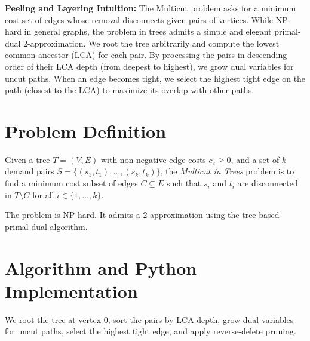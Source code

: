 \documentclass[11pt,oneside]{book}
\begin{document}
\begin{intuitionbox}
\textbf{Peeling and Layering Intuition:} The Multicut problem asks for a minimum cost set of edges whose removal disconnects given pairs of vertices. While NP-hard in general graphs, the problem in trees admits a simple and elegant primal-dual 2-approximation. We root the tree arbitrarily and compute the lowest common ancestor (LCA) for each pair. By processing the pairs in descending order of their LCA depth (from deepest to highest), we grow dual variables for uncut paths. When an edge becomes tight, we select the highest tight edge on the path (closest to the LCA) to maximize its overlap with other paths.
\end{intuitionbox}

\section{Problem Definition}
Given a tree $T = (V, E)$ with non-negative edge costs $c_e \ge 0$, and a set of $k$ demand pairs $S = \{(s_1, t_1), \dots, (s_k, t_k)\}$, the \emph{Multicut in Trees} problem is to find a minimum cost subset of edges $C \subseteq E$ such that $s_i$ and $t_i$ are disconnected in $T \setminus C$ for all $i \in \{1, \dots, k\}$.

The problem is NP-hard. It admits a 2-approximation using the tree-based primal-dual algorithm.

\section{Algorithm and Python Implementation}
We root the tree at vertex 0, sort the pairs by LCA depth, grow dual variables for uncut paths, select the highest tight edge, and apply reverse-delete pruning.
\end{document}
